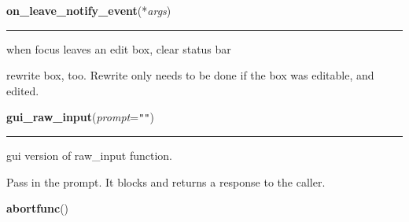     \label{pyshowall:pyshowall:on_leave_notify_event}

    \vspace{0.5ex}

    \begin{boxedminipage}{\textwidth}

    \raggedright \textbf{on\_leave\_notify\_event}(*\textit{args})

    \vspace{-1.5ex}

    \rule{\textwidth}{0.5\fboxrule}
    when focus leaves an edit box, clear status bar

    rewrite box, too. Rewrite only needs to be done if the box was 
    editable, and edited.

    \vspace{1ex}

    \end{boxedminipage}

    \label{pyshowall:pyshowall:gui_raw_input}

    \vspace{0.5ex}

    \begin{boxedminipage}{\textwidth}

    \raggedright \textbf{gui\_raw\_input}(\textit{prompt}=\texttt{""})

    \vspace{-1.5ex}

    \rule{\textwidth}{0.5\fboxrule}
    gui version of raw\_input function.

    Pass in the prompt. It blocks and returns a response to the caller.

    \vspace{1ex}

    \end{boxedminipage}

    \label{pyshowall:pyshowall:abortfunc}

    \vspace{0.5ex}

    \begin{boxedminipage}{\textwidth}

    \raggedright \textbf{abortfunc}()

    \end{boxedminipage}

